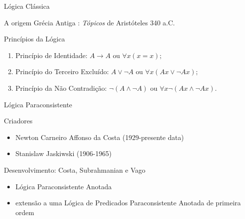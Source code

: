 \begin{frame}{Lógica Clássica}
\begin{block}{A origem \tiny \cite{JoaoInacio}}
Grécia Antiga : \emph{Tópicos} de Aristóteles  340 a.C.
\end{block}
\begin{block}{Princípios da Lógica \tiny \cite{JoaoInacio}}

\begin{enumerate}
\item Princípio de Identidade: 
    \begin{math}
	A \rightarrow A 
	\textrm{ ou } 
	\forall x(x=x);
    \end{math}

\item Princípio do Terceiro Excluído:
    \begin{math}
	A \vee \neg A
	\textrm{ ou }
	\forall x(Ax \vee \neg Ax);
    \end{math}

\item Princípio da Não Contradição: 
    \begin{math}
	\neg (A \wedge \neg A)
	\textrm{ ou }
	\forall x\neg(Ax \wedge \neg Ax).
    \end{math}

\end{enumerate}


\end{block}
\end{frame}

\begin{frame}{Lógica Paraconsistente}

\begin{block}{Criadores \tiny \cite{DecioKrause}}
\begin{itemize}
\item Newton Carneiro Affonso da Costa (1929-presente data)
\item Stanislaw Jaskiwski (1906-1965)
\end{itemize}
\end{block}

\begin{block}{Desenvolvimento: Costa, Subrahmanian e Vago \tiny \cite{DecioKrause}}
\begin{itemize}
\item Lógica Paraconsistente Anotada
\item extensão a uma Lógica de Predicados Paraconsistente Anotada de primeira ordem 
\end{itemize}
\end{block}

\end{frame}

